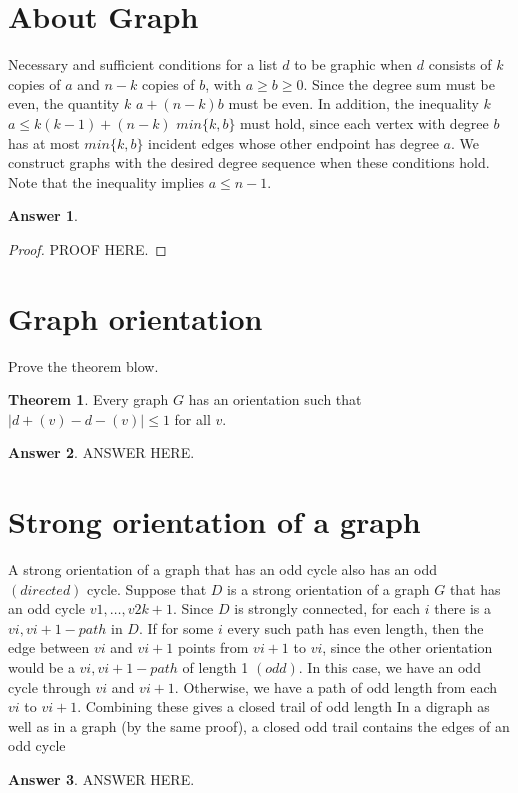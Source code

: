 \documentclass[a4paper]{article}
\renewcommand{\(}{\left(}
\renewcommand{\)}{\right)}
\theoremstyle{plain}
\theoremstyle{plain}
\theoremstyle{definition}
\newtheorem*{answer}{Answer}
\newtheorem{theorem}{Theorem}[section]
\begin{document}
\section{About Graph}
Necessary and sufficient conditions for a list $d$ to be graphic when $d$ consists of $k$ copies of $a$ and $n − k$ copies of $b$, with $a \geq b \geq 0$. Since the degree sum must be even, the quantity $k$ $a + (n − k)b$ must be even. In addition, the inequality $k$ $a \leq k(k − 1) + (n − k)$ $min\{k, b\}$ must hold, since each vertex with degree $b$ has at most $min\{k, b\}$ incident edges whose other endpoint has degree $a$. We construct graphs with the desired degree sequence when these conditions hold. Note that the inequality implies $a \leq n − 1$.
\begin{shaded}
\begin{answer}
\begin{proof}
PROOF HERE.
\end{proof}
\end{answer}
\end{shaded}

\section{Graph orientation}
Prove the theorem blow.
\begin{theorem}
Every graph $G$ has an orientation such that $|d +(v) - d-(v)| \leq 1$ for all $v$.
\end{theorem}
\begin{shaded}
\begin{answer}
ANSWER HERE.
\end{answer}
\end{shaded}


\section{Strong orientation of a graph}
A strong orientation of a graph that has an odd cycle also has an odd $(directed)$ cycle. Suppose that $D$ is a strong orientation of a graph $G$ that has an odd cycle $v1, \dots , v2k+1$. Since $D$ is strongly connected, for each $i$ there is a $vi, vi+1-path$ in $D$. If for some $i$ every such path has even length, then the edge between $vi$ and $vi+1$ points from $vi+1$ to $vi$, since the other orientation would be a $vi, vi+1-path$ of length 1 $(odd)$. In this case, we have an odd cycle through $vi$ and $vi+1$. Otherwise, we have a path of odd length from each $vi$ to $vi+1$. Combining these gives a closed trail of odd length In a digraph as well as in a graph (by the same proof), a closed odd trail contains the edges of an odd cycle
\begin{shaded}
\begin{answer}
ANSWER HERE.
\end{answer}
\end{shaded}
\end{document}
